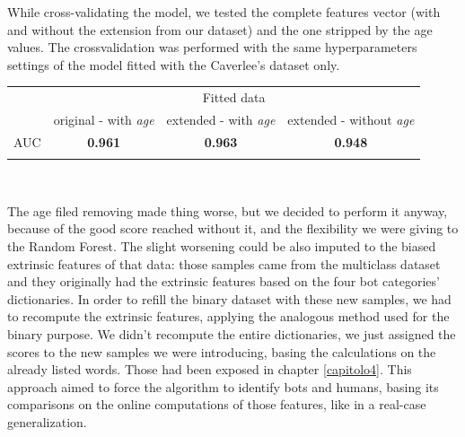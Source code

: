 While cross-validating the model, we tested the complete features vector (with and without the extension from our dataset) and the one stripped by the age values. The crossvalidation was performed with the same hyperparameters settings of the model fitted with the Caverlee's dataset only.

{
	\centering
	\begin{tabular}{@{}cccc@{}}
		\multicolumn{1}{c}{} & 
		\multicolumn{3}{c}{Fitted data} \\ 
		\cline{2-4}
		\multicolumn{1}{c|}{} & 
		\multicolumn{1}{c|}{original - with \textit{age} } & 
		\multicolumn{1}{c|}{extended - with \textit{age} } & 
		\multicolumn{1}{c|}{extended - without \textit{age}} \\
		\cline{1-4}
		\multicolumn{1}{|c|}{AUC} & 
		\multicolumn{1}{c|}{\textbf{0.961}} & 
		\multicolumn{1}{c|}{\textbf{0.963}} & 
		\multicolumn{1}{c|}{\textbf{0.948}} \\
		\cline{1-4}\\
	\end{tabular}\\
}

The age filed removing made thing worse, but we decided to perform it anyway, because of the good score reached without it, and the flexibility we were giving to the Random Forest. The slight worsening could be also imputed to the biased extrinsic features of that data: those samples came from the multiclass dataset and they originally had the extrinsic features based on the four bot categories' dictionaries.
In order to refill the binary dataset with these new samples, we had to recompute the extrinsic features, applying the analogous method used for the binary purpose.
We didn't recompute the entire dictionaries, we just assigned the scores to the new samples we were introducing, basing the calculations on the already listed words. Those had been exposed in chapter \ref{capitolo4}. This approach aimed to force the algorithm to identify bots and humans, basing its comparisons on the online computations of those features, like in a real-case generalization.

